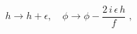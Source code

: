\begin{equation}
h \to h+\epsilon, \quad \phi \to \phi - \frac{2\, i\, \epsilon\, h}{f} \; ,
\end{equation}

